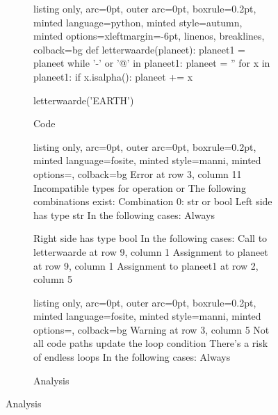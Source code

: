 
\begin{figure}[H]
\caption{Submision 5}
\label{sbm:sub5}
  \begin{subfigure}{\textwidth}
        \caption{Code}
        \label{sbm:sub5_code}

  \begin{tcblisting}{listing only, 
    arc=0pt,
    outer arc=0pt, 
    boxrule=0.2pt,
    minted language=python,
    minted style=autumn,
    minted options={xleftmargin=-6pt, linenos, breaklines},
    colback=bg }
def letterwaarde(planeet):
    planeet1 = planeet
    while '-' or '@' in planeet1:
        planeet = ''
        for x in planeet1:
            if x.isalpha():
                planeet += x

letterwaarde('EARTH')
\end{tcblisting}
\end{subfigure}
\begin{subfigure}{\textwidth}
        \caption{Analysis}
        \label{sbm:sub5_anal}
\begin{tcblisting}{listing only, 
    arc=0pt,
    outer arc=0pt, 
    boxrule=0.2pt,
    minted language=fosite,
    minted style=manni,
    minted options={},
    colback=bg }
Error at row 3, column 11
  Incompatible types for operation or
  The following combinations exist:
  Combination 0: str or bool
    Left side has type str
    In the following cases:
      Always

    Right side has type bool
    In the following cases:
      Call to letterwaarde at row 9, column 1
      Assignment to planeet at row 9, column 1
      Assignment to planeet1 at row 2, column 5
\end{tcblisting}
\begin{tcblisting}{listing only, 
    arc=0pt,
    outer arc=0pt, 
    boxrule=0.2pt,
    minted language=fosite,
    minted style=manni,
    minted options={},
    colback=bg }
Warning at row 3, column 5
  Not all code paths update the loop condition
  There's a risk of endless loops
  In the following cases:
    Always
\end{tcblisting}
\end{subfigure}
\end{figure}
